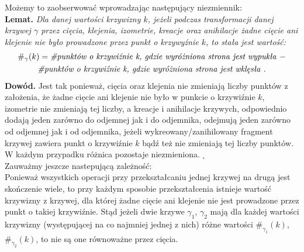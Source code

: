\documentclass[a4paper, 12pt, twosided]{article}
\newcommand{\smalltodoII}[1]{\hfill \break \textbf{\ \textcolor{violet}{To do: #1}}\hfill \break}
\begin{document}
\noindent Możemy to zaobserwować wprowadzając następujący niezmiennik: \\
\textbf{Lemat. }\textit{Dla danej wartości krzywizny $k$, jeżeli podczas transformacji danej 
 krzywej $\gamma$ przez cięcia,
 klejenia, 
izometrie, 
kreacje oraz anihilacje żadne cięcie ani klejenie nie było prowadzone przez punkt o 
krzywyźnie $k$, to stała jest wartość: }
\begin{gather}\#_{\gamma}(k) = \text{\textit{\#punktów o krzywiźnie k, gdzie wyróżniona strona jest 
wypukła }} -\\
\text{\textit{\#punktów o krzywiźnie k, gdzie wyróżniona strona jest wklęsła
}} \notag.
\end{gather}
\textbf{Dowód.} Jest tak ponieważ, cięcia oraz klejenia nie zmieniają liczby punktów z założenia, 
 że żadne cięcie 
ani klejenie nie było w punkcie o krzywiźnie $k$, izometrie nie zmieniają tej liczby, a
kreacje i anihilacje krzywych, odpowiednio dodają jeden zarówno do odjemnej jak i do odjemnika, 
odejmują 
jeden zarówno od odjemnej jak i od odjemnika, jeżeli wykreowany/zanihilowany fragment krzywej 
 zawiera punkt o krzywiźnie $k$ bądź też nie zmieniają tej liczby punktów. 
W każdym przypadku
różnica pozostaje niezmieniona. $_\square$\\
Zauważmy jeszcze nastepującą zależność: \\
Ponieważ wszystkich operacji przy przekształcaniu jednej krzywej na drugą jest skończenie wiele, 
to przy każdym sposobie przekształcenia istnieje wartość krzywizny z krzywej, dla której żadne 
cięcie ani klejenie nie jest prowadzone przez punkt o takiej krzywiźnie. Stąd jeżeli dwie 
krzywe $\gamma_1$, $\gamma_2$ mają dla każdej wartości krzywizny (występującej na co najmniej 
jednej z nich) różne wartości $\#_{\gamma_1}(k)$, $\#_{\gamma_2}(k)$, to nie są one równoważne 
przez cięcia. \\
\end{document}
